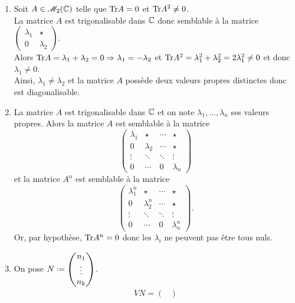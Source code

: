 \begin{solution}
    \begin{enumerate}
        \item Soit $A \in \mathscr{M}_2(\mathbb{C})$ telle que $\mathrm{Tr}{A} = 0$ et $\mathrm{Tr}{A^2} \not=0$. \\
        La matrice $A$ est trigonalisable dans $\mathbb{C}$ donc semblable à la matrice $\begin{pmatrix} \lambda_1 & \star \\ 0 & \lambda_2 \end{pmatrix}$. \\
        Alors $\mathrm{Tr}{A} = \lambda_1 + \lambda_2 = 0 \Rightarrow \lambda_1 = - \lambda_2$ et $\mathrm{Tr}{A^2} = \lambda_1^2 + \lambda_2^2 = 2 \lambda_1^2 \not=0$ et donc $\lambda_1 \not=0$. \\
        Ainsi, $\lambda_1 \not= \lambda_2$ et la matrice $A$ possède deux valeurs propres distinctes donc est diagonalisable. 
        \item La matrice $A$ est trigonalisable dans $\mathbb{C}$ et on note $\lambda_1, \dots, \lambda_n$ ses valeurs propres. Alors la matrice $A$ est semblable à la matrice 
        $$
        \begin{pmatrix}
            \lambda_1 & \star & \cdots & \star \\
            0 & \lambda_2 & \cdots & \star \\
            \vdots & \ddots &\ddots & \vdots \\
            0 & \cdots & 0 & \lambda_n
        \end{pmatrix}
        $$
        et la matrice $A^n$ est semblable à la matrice
        $$
        \begin{pmatrix}
            \lambda_1^n & \star & \cdots & \star \\
            0 & \lambda_2^n & \cdots & \star \\
            \vdots & \ddots &\ddots & \vdots \\
            0 & \cdots & 0 & \lambda_n^n
        \end{pmatrix}.
        $$
        Or, par hypothèse, $\mathrm{Tr}{A^n} = 0$ donc les $\lambda_i$ ne peuvent pas être tous nuls.
        \item On pose $N \defeq \begin{pmatrix} n_1  \\ \vdots \\ n_k \end{pmatrix}$.
        \begin{align*}
            V N = 
            \begin{pmatrix}

\end{pmatrix}
\end{align*}
\end{enumerate}
\end{solution}
